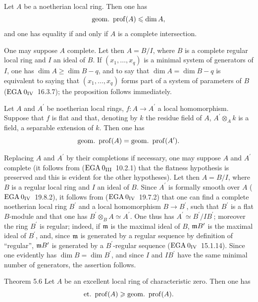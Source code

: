 \begin{proposition} \label{XIV.5.4} Let $A$ be a noetherian local ring. Then one has
$$
\operatorname{geom.\ prof}(A)\leqslant\dim A,
$$
and one has equality if and only if $A$ is a complete intersection.
\end{proposition}

One may suppose $A$ complete. Let then $A=B/I$, where $B$ is a complete regular local ring and $I$ an ideal of $B$. If $(x_{1},\dots, x_{q})$ is a minimal system of generators of $I$, one has $\dim A\geq\dim B-q$, and to say that $\dim A=\dim B-q$ is equivalent to saying that $(x_{1},\dots, x_{q})$ forms part of a system of parameters of $B$ ($\textup{EGA}\kern.2em 0_{\textup{IV}}$~16.3.7); the proposition follows immediately.

\begin{proposition} \label{XIV.5.5} Let $A$ and $A^{\prime}$ be noetherian local rings, $f\colon A\to A^{\prime}$ a local homomorphism. Suppose that $f$ is flat and that, denoting by $k$ the residue field of $A$, $A^{\prime}\otimes_{A}k$ is a field, a separable extension of $k$. Then one has
$$
\operatorname{geom.\ prof}(A)=\operatorname{geom.\ prof}(A^{\prime}).
$$
\end{proposition}

Replacing $A$ and $A^{\prime}$ by their completions if necessary, one may suppose $A$ and $A^{\prime}$ complete (it follows from ($\textup{EGA}\kern.2em 0_{\textup{III}}$~10.2.1) that the flatness hypothesis is preserved and this is evident for the other hypotheses). Let then $A=B/I$, where $B$ is a regular local ring and $I$ an ideal of $B$. Since $A^{\prime}$ is formally smooth over $A$ ($\textup{EGA}\kern.2em 0_{\textup{IV}}$~19.8.2), it follows from ($\textup{EGA}\kern.2em 0_{\textup{IV}}$~19.7.2) that one can find a complete noetherian local ring $B^{\prime}$ and a local homomorphism $B\to B^{\prime}$, such that $B^{\prime}$ is a flat $B$-module and that one has $B^{\prime}\otimes_{B}A\simeq A^{\prime}$. One thus has $A^{\prime}\simeq B^{\prime}/IB^{\prime}$; moreover the ring $B^{\prime}$ is regular; indeed, if $\mathfrak{m}$ is the maximal ideal of $B$, $\mathfrak{m} B^{\prime}$ is the maximal ideal of $B^{\prime}$, and, since $\mathfrak{m}$ is generated by a regular sequence by definition of ``regular'', $\mathfrak{m} B^{\prime}$ is generated by a $B^{\prime}$-regular sequence ($\textup{EGA}\kern.2em 0_{\textup{IV}}$~15.1.14). Since one evidently has $\dim B=\dim B^{\prime}$, and since $I$ and $IB^{\prime}$ have the same minimal number of generators, the assertion follows.

\label{XIV.5.6}
\begin{enonce*}{Theorem 5.6\ndemark}
Let $A$ be an excellent local ring of characteristic zero. Then one has
$$
\operatorname{et.\ prof}(A)\geqslant\operatorname{geom.\ prof}(A).
$$
\end{enonce*}

